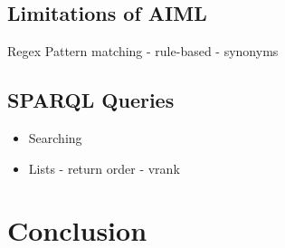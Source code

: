 \subsection{Limitations of AIML}
Regex
Pattern matching - rule-based - synonyms

\subsection{SPARQL Queries}
\begin{itemize}
	\item Searching
	\item Lists - return order - vrank
\end{itemize}
\section{Conclusion}


